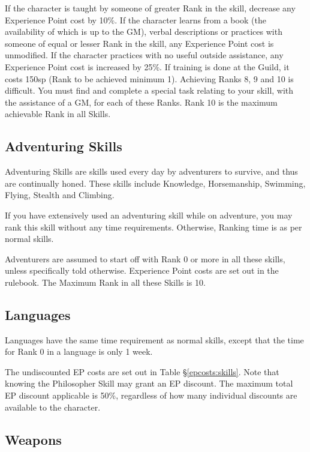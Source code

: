 \begin{multicols*}{3}
If the character is taught by someone of greater Rank in the skill,
decrease any Experience Point cost by 10\%.  If the character learns
from a book (the availability of which is up to the GM), verbal
descriptions or practices with someone of equal or lesser Rank in the
skill, any Experience Point cost is unmodified.  If the character
practices with no useful outside assistance, any Experience Point cost
is increased by 25\%.  If training is done at the Guild, it costs
150sp \x (Rank to be achieved minimum 1). Achieving Ranks 8, 9 and 10
is difficult.  You must find and complete a special task relating to
your skill, with the assistance of a GM, for each of these Ranks. Rank
10 is the maximum achievable Rank in all Skills.

\subsection{Adventuring Skills}

Adventuring Skills are skills used every day by adventurers to
survive, and thus are continually honed. These skills include
Knowledge, Horsemanship, Swimming, Flying, Stealth and Climbing.

If you have extensively used an adventuring skill while on adventure,
you may rank this skill without any time requirements. Otherwise,
Ranking time is as per normal skills.

Adventurers are assumed to start off with Rank 0 or more in all these
skills, unless specifically told otherwise. Experience Point costs are
set out in the rulebook.  The Maximum Rank in all these Skills is 10.

\subsection{Languages}

Languages have the same time requirement as normal skills, except that
the time for Rank 0 in a language is only 1 week.

The undiscounted EP costs are set out in Table \S\ref{epcosts:skills}.
Note that knowing the Philosopher Skill may grant an EP discount. The
maximum total EP discount applicable is 50\%, regardless of how many
individual discounts are available to the character.

\subsection{Weapons}


\end{multicols*}
